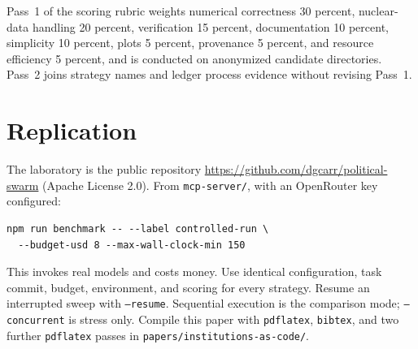 \documentclass[11pt,a4paper]{article}
\begin{document}
Pass~1 of the scoring rubric weights numerical correctness 30 percent, nuclear-data
handling 20 percent, verification 15 percent, documentation 10 percent, simplicity 10
percent, plots 5 percent, provenance 5 percent, and resource efficiency 5 percent, and
is conducted on anonymized candidate directories. Pass~2 joins strategy names and ledger
process evidence without revising Pass~1.

\section{Replication}
\label{app:replication}

The laboratory is the public repository \url{https://github.com/dgcarr/political-swarm}
(Apache License 2.0). From \texttt{mcp-server/}, with an OpenRouter key configured:

\begin{verbatim}
npm run benchmark -- --label controlled-run \
  --budget-usd 8 --max-wall-clock-min 150
\end{verbatim}

This invokes real models and costs money. Use identical configuration, task commit,
budget, environment, and scoring for every strategy. Resume an interrupted sweep with
\texttt{--resume}. Sequential execution is the comparison mode; \texttt{--concurrent} is
stress only. Compile this paper with \texttt{pdflatex}, \texttt{bibtex}, and two further
\texttt{pdflatex} passes in \texttt{papers/institutions-as-code/}.



\end{document}
